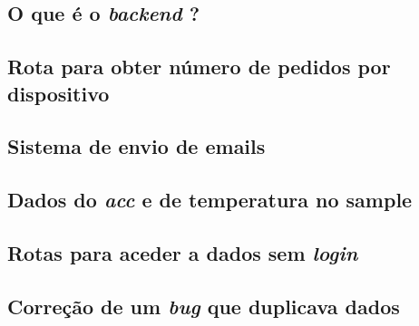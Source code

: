 \clearpage
\subsection{O que é o \textit{backend} ?}

\clearpage
\subsection{Rota para obter número de pedidos por dispositivo}

\clearpage
\subsection{Sistema de envio de emails}

\clearpage
\subsection{Dados do \textit{acc} e de temperatura no sample}

\clearpage
\subsection{Rotas para aceder a dados sem \textit{login}}

\clearpage
\subsection{Correção de um \textit{bug} que duplicava dados}

